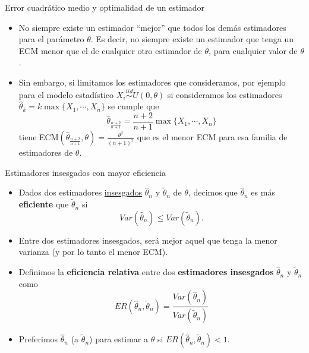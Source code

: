 \documentclass{beamer}
\theoremstyle{definition}
\begin{document}
\begin{frame}{\color{rosee}Error cuadr\'atico medio y optimalidad de un estimador}
 
    \begin{itemize}
    \item No siempre existe un estimador ``mejor'' que todos los demás estimadores para el parámetro $\theta$. Es decir, no siempre existe un estimador que tenga un ECM menor que el de cualquier otro estimador de $\theta$, para cualquier valor de $\theta$. \medskip
    
    \item  Sin embargo, si limitamos los estimadores que consideramos, por ejemplo para el modelo estadístico $X_i\stackrel{iid}{\sim} U(0,\theta)$ si consideramos los estimadores $\widehat{\theta}_{k}=k\max\{X_1, \cdots ,X_n \}$ se cumple que \[\widehat{\theta}_{\frac{n+2}{n+1}}=\frac{n+2}{n+1}\max\{X_1, \cdots ,X_n \}\] tiene ECM$\left(\widehat{\theta}_{\frac{n+2}{n+1}},\theta\right)=\frac{\theta^2}{(n+1)^2}$ que es el menor ECM para esa familia de estimadores de $\theta$.
 
    \end{itemize}
  
\end{frame}


\begin{frame}{\color{rosee}Estimadores insesgados con mayor eficiencia}
        
    \begin{itemize}
  \item  Dados dos estimadores \underline{insesgados} $\widehat{\theta}_n$ y
    $\widetilde{\theta}_n$ de $\theta$, decimos que $\widehat{\theta}_n$ es
    m\'as \textbf{eficiente} que $\widetilde{\theta}_n$ si
    \[Var(\widehat{\theta}_n) \leq Var(\widetilde{\theta}_n).\]
      \item Entre dos estimadores insesgados, será mejor aquel que tenga la menor varianza (y por lo tanto el menor ECM).
      \item Definimos la \textbf{eficiencia relativa} entre dos \textbf{estimadores insesgados} $\widehat{\theta}_n$ y $\widetilde{\theta}_n$ como
      \[ER(\widehat{\theta}_n,\widetilde{\theta}_n)=\frac{Var(\widehat{\theta}_n)}{Var(\widetilde{\theta}_n)}\]
      \item Preferimos $\widehat{\theta}_n$ (a $\widetilde{\theta}_n$) para estimar a $\theta$ si $ER(\widehat{\theta}_n,\widetilde{\theta}_n)<1$.
  \end{itemize}
  
  
  
  
\end{frame}
\end{document}
